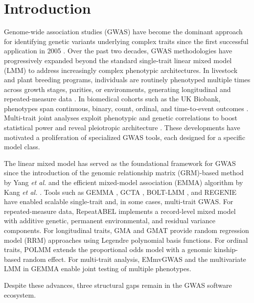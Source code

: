 \documentclass[11pt,a4paper]{article}
\newcommand{\etal}{\textit{et al.}}
\begin{document}
\newpage
\section{Introduction}
\label{sec:introduction}

Genome-wide association studies (GWAS) have become the dominant approach for identifying genetic variants underlying complex traits since the first successful application in 2005 \citep{visscher2017,manolio2009}. Over the past two decades, GWAS methodologies have progressively expanded beyond the standard single-trait linear mixed model (LMM) to address increasingly complex phenotypic architectures. In livestock and plant breeding programs, individuals are routinely phenotyped multiple times across growth stages, parities, or environments, generating longitudinal and repeated-measure data \citep{mrode2014,schaeffer2004}. In biomedical cohorts such as the UK Biobank, phenotypes span continuous, binary, count, ordinal, and time-to-event outcomes \citep{sudlow2015,bycroft2018,willer2014}. Multi-trait joint analyses exploit phenotypic and genetic correlations to boost statistical power and reveal pleiotropic architecture \citep{korte2012,zhou2014mv,berg2019}. These developments have motivated a proliferation of specialized GWAS tools, each designed for a specific model class.

The linear mixed model has served as the foundational framework for GWAS since the introduction of the genomic relationship matrix (GRM)-based method by Yang \etal{} \citep{yang2011gcta} and the efficient mixed-model association (EMMA) algorithm by Kang \etal{} \citep{kang2010}. Tools such as GEMMA \citep{zhou2012gemma}, GCTA \citep{yang2011gcta}, BOLT-LMM \citep{loh2015}, and REGENIE \citep{mbatchou2021} have enabled scalable single-trait and, in some cases, multi-trait GWAS. For repeated-measure data, RepeatABEL \citep{ronnegard2010} implements a record-level mixed model with additive genetic, permanent environmental, and residual variance components. For longitudinal traits, GMA \citep{yao2022} and GMAT \citep{zhang2020gmat} provide random regression model (RRM) approaches using Legendre polynomial basis functions. For ordinal traits, POLMM \citep{bi2020} extends the proportional odds model with a genomic kinship-based random effect. For multi-trait analysis, EMmvGWAS \citep{jiang2024} and the multivariate LMM in GEMMA \citep{zhou2014mv} enable joint testing of multiple phenotypes.

Despite these advances, three structural gaps remain in the GWAS software ecosystem.
\end{document}

